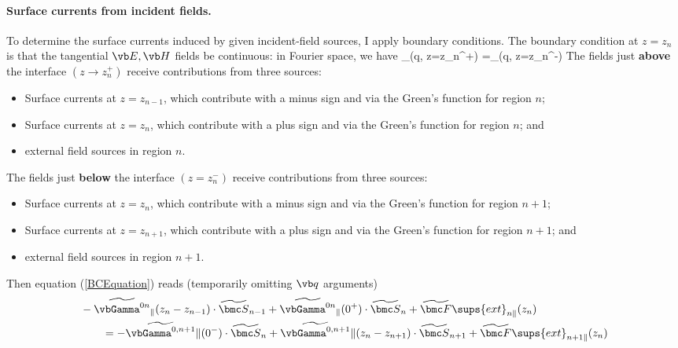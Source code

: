 \documentclass[letterpaper]{article}
\renewcommand{\wt}{\widetilde}
\begin{document}
\paragraph{Surface currents from incident fields.}

To determine the surface currents induced by given incident-field
sources, I apply boundary conditions.
The boundary condition at $z=z_n$ is that the tangential $\vb E, \vb H$
fields be continuous: in Fourier space, we have
{ \wt{\bmc F}_{\parallel}(\vb q, z=z_n^+)
 =\wt{\bmc F}_{\parallel}(\vb q, z=z_n^-)
}
The fields just \textbf{above} the interface $(z\to z_n^+)$ receive
contributions from three sources:
\begin{itemize}
 \item Surface currents at $z=z_{n-1}$, which contribute with
       a minus sign and via the Green's function for region $n$;
 \item Surface currents at $z=z_{n}$, which contribute with
       a plus sign and via the Green's function for region $n$; and
 \item external field sources in region $n$.
\end{itemize}
The fields just \textbf{below} the interface $(z=z_n^-)$ receive
contributions from three sources:
\begin{itemize}
 \item Surface currents at $z=z_{n}$, which contribute with
       a minus sign and via the Green's function for region $n+1$;
 \item Surface currents at $z=z_{n+1}$, which contribute with
       a plus sign and via the Green's function for region $n+1$; and
 \item external field sources in region $n+1$.
\end{itemize}
Then equation (\ref{BCEquation}) reads (temporarily omitting $\vb q$
arguments)
\begin{align*}
&
-\wt{\vbGamma^{0n}}_{\parallel}(z_n-z_{n-1})\cdot \wt{\bmc S}_{n-1}
+\wt{\vbGamma^{0n}}_{\parallel}(0^+) \cdot \wt{\bmc S}_{n}
+\wt{\bmc F}\sups{ext}_{n\parallel}(z_n)
\\
&\qquad=
-\wt{\vbGamma^{0,n+1}}{\parallel}(0^-) \cdot \wt{\bmc S}_{n}
+\wt{\vbGamma^{0,n+1}}{\parallel}(z_n-z_{n+1})\cdot \wt{\bmc S}_{n+1}
+\wt{\bmc F}\sups{ext}_{n+1\parallel}(z_n)
\end{align*}
\end{document}
